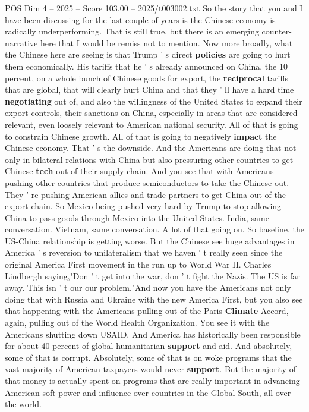 \begin{textsample}{POS Dim 4 – 2025 – Score 103.00 – 2025/t003002.txt}
So the story that you and I have been discussing for the last couple of years is the Chinese economy is radically underperforming.
That is still true, but there is an emerging counter-narrative here that I would be remiss not to mention.
Now more broadly, what the Chinese here are seeing is that Trump ' s direct \textbf{policies} are going to hurt them economically.
His tariffs that he ' s already announced on China, the 10 percent, on a whole bunch of Chinese goods for export, the \textbf{reciprocal} tariffs that are global, that will clearly hurt China and that they ' ll have a hard time \textbf{negotiating} out of, and also the willingness of the United States to expand their export controls, their sanctions on China, especially in areas that are considered relevant, even loosely relevant to American national security.
All of that is going to constrain Chinese growth.
All of that is going to negatively \textbf{impact} the Chinese economy.
That ' s the downside.
And the Americans are doing that not only in bilateral relations with China but also pressuring other countries to get Chinese \textbf{tech} out of their supply chain.
And you see that with Americans pushing other countries that produce semiconductors to take the Chinese out.
They ' re pushing American allies and trade partners to get China out of the export chain.
So Mexico being pushed very hard by Trump to stop allowing China to pass goods through Mexico into the United States.
India, same conversation.
Vietnam, same conversation.
A lot of that going on.
So baseline, the US-China relationship is getting worse.
But the Chinese see huge advantages in America ' s reversion to unilateralism that we haven ' t really seen since the original America First movement in the run up to World War II.
Charles Lindbergh saying,"Don ' t get into the war, don ' t fight the Nazis.
The US is far away.
This isn ' t our our problem."And now you have the Americans not only doing that with Russia and Ukraine with the new America First, but you also see that happening with the Americans pulling out of the Paris \textbf{Climate} Accord, again, pulling out of the World Health Organization.
You see it with the Americans shutting down USAID.
And America has historically been responsible for about 40 percent of global humanitarian \textbf{support} and aid.
And absolutely, some of that is corrupt.
Absolutely, some of that is on woke programs that the vast majority of American taxpayers would never \textbf{support}.
But the majority of that money is actually spent on programs that are really important in advancing American soft power and influence over countries in the Global South, all over the world.

\end{textsample}
